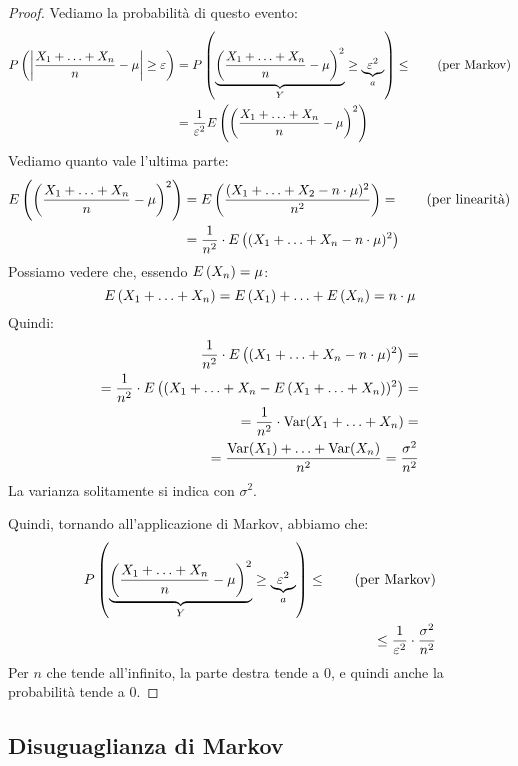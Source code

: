 \begin{proof}
Vediamo la probabilit\`a di questo evento:
\begin{align*}
P \left( {\left\lvert{\frac{X_1 + \ldots + X_n}{n} - \mu}\right\rvert \ge \varepsilon} \right) &=
P \left( {\underbrace{{\left(\frac{X_1 + \ldots + X_n}{n} - \mu \right)}^2}_{Y} \ge \underbrace{\varepsilon^2}_{a}} \right) \le \tag{per Markov} \\
&= \frac{1}{\varepsilon^2} E \left( {\left(\frac{X_1 + \ldots + X_n}{n} - \mu \right)}^2 \right)
\end{align*}
Vediamo quanto vale l'ultima parte:
\begin{align*}
E \left( {\left(\frac{X_1 + \ldots + X_n}{n} - \mu \right)}^2 \right) &= 
E \left( \frac{(X_1 + \ldots + X_2 - n \cdot \mu)^2}{n^2} \right) = \tag{per linearit\`a} \\
&= \frac{1}{n^2} \cdot E \left( (X_1 + \ldots + X_n - n \cdot \mu)^2 \right) 
\end{align*}
Possiamo vedere che, essendo $E \left( X_n \right) = \mu$:
\[
E \left( X_1 + \ldots + X_n \right) = E \left( X_1 \right) + \ldots + E \left( X_n \right) = n \cdot \mu
\]
Quindi:
\begin{align*}
\frac{1}{n^2} \cdot E \left( (X_1 + \ldots + X_n - n \cdot \mu)^2 \right) = \\
= \frac{1}{n^2} \cdot E \left( (X_1 + \ldots + X_n - E \left( X_1 + \ldots + X_n \right))^2 \right) = \\
= \frac{1}{n^2} \cdot \operatorname{Var} (X_1 + \ldots + X_n) = \\
= \frac{\operatorname{Var} (X_1) + \ldots + \operatorname{Var} (X_n)}{n^2} = \frac{\sigma^2}{n^2}
\end{align*}
La varianza solitamente si indica con $\sigma^2$.

Quindi, tornando all'applicazione di Markov, abbiamo che:
\begin{align*}
P \left( {\underbrace{{\left(\frac{X_1 + \ldots + X_n}{n} - \mu \right)}^2}_{Y} \ge \underbrace{\varepsilon^2}_{a}} \right) \le \tag{per Markov} \\
\le \frac{1}{\varepsilon^2} \cdot \frac{\sigma^2}{n^2}
\end{align*}
Per $n$ che tende all'infinito, la parte destra tende a 0, e quindi anche la probabilit\`a tende a 0.
\end{proof}

\subsection{Disuguaglianza di Markov}

